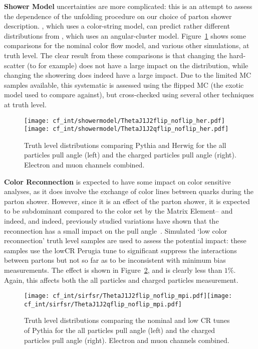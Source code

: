   \textbf{Shower Model} uncertainties are more complicated: this is an attempt to assess the dependence of the unfolding procedure on our choice of parton shower description. \Pythia, which uses a color-string model, can predict rather different distributions from \Herwig, which uses an angular-cluster model. Figure~\ref{fig:color:uncertainties:theory:shower} shows some comparisons for the nominal color flow model, and various other simulations, at truth level. The clear result from these comparisons is that changing the hard-scatter (\Powheg to \Mcatnlo for example) does not have a large impact on the distribution, while changing the showering does indeed have a large impact. Due to the limited MC samples available, this systematic is assessed using the flipped MC (the exotic model used to compare against), but cross-checked using several other techniques at truth level.

\begin{figure}[h!]
\begin{center}
\texttt{[image: cf\_int/showermodel/ThetaJ1J2flip\_noflip\_her.pdf]}\texttt{[image: cf\_int/showermodel/ThetaJ1J2qflip\_noflip\_her.pdf]}
\caption{Truth level distributions comparing Pythia and Herwig for the all particles pull angle (left) and the charged particles pull angle (right).  Electron and muon channels combined.}
\label{fig:color:uncertainties:theory:shower}
\end{center}
\end{figure}

	\textbf{Color Reconnection} is expected to have some impact on color sensitive analyses, as it does involve the exchange of color lines between quarks during the parton shower. However, since it is an effect of the parton shower, it is expected to be subdominant compared to the color set by the Matrix Element-- and indeed, and indeed, previously studied variations have shown that the reconnection has a small impact on the pull angle~\cite{Altheimer:2013yza}.  Simulated `low color reconnection' truth level samples are used to assess the potential impact: these samples use the lowCR Perugia tune to significant suppress the interactions between partons but not so far as to be inconsistent with minimum bias measurements. The effect is shown in Figure~\ref{fig:color:uncertainties:theory:cr}, and is clearly less than $1\%$. Again, this affects both the all particles and charged particles measurement.


\begin{figure}[h!]
\begin{center}
\texttt{[image: cf\_int/sirfsr/ThetaJ1J2flip\_noflip\_mpi.pdf]}\texttt{[image: cf\_int/sirfsr/ThetaJ1J2qflip\_noflip\_mpi.pdf]}
\caption{Truth level distributions comparing the nominal and low CR tunes of Pythia for the all particles pull angle (left) and the charged particles pull angle (right).  Electron and muon channels combined.}
\label{fig:color:uncertainties:theory:cr}
\end{center}
\end{figure}


